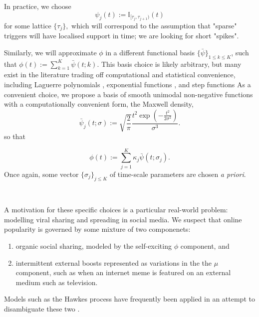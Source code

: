 \documentclass[11pt]{article}
\providecommand{\tightlist}{%
      \setlength{\itemsep}{0pt}\setlength{\parskip}{0pt}}
\begin{document}
In practice, we choose
\[\psi_j(t) := \mathbb{I}_{[\tau_{j},\tau_{j+1})}(t)\] for some lattice
\(\{\tau_j\},\) which will correspond to the assumption that "sparse"
triggers will have localised support in time; we are looking for short
"spikes".

Similarly, we will approximate \(\phi\) in a different functional basis
\(\{\bar{\psi}\}_{1\leq k \leq K}\), such that
\(\phi(t):= \sum_{k=1}^K \bar{\psi}(t;k)\). This basis choice is likely
arbitrary, but many exist in the literature trading off computational
and statistical convenience, including Laguerre polynomials
\cite{ogata_linear_1982}, exponential functions
\cite{schoenberg_consistent_2005,rambaldi_modeling_2015}, and step
functions \cite{eichler_graphical_2016} As a convenient choice, we
propose a basis of smooth unimodal non-negative functions with a
computationally convenient form, the Maxwell density,
\[\bar{\psi}_j(t;\sigma):=\sqrt{\frac{2}{\pi}} \frac{t^2\exp\left(-\frac{t^2}{2\sigma^2}\right)}{\sigma^3}.\]
so that

\[\phi(t):= \sum_{j=1}^K \kappa_j\bar{\psi}(t;\sigma_j).\] Once again,
some vector \(\{\sigma_j\}_{j\leq K}\) of time-scale parameters are
chosen \emph{a priori}.



    \begin{center}
    \end{center}
    { \hspace*{\fill} \\}
    
    A motivation for these specific choices is a particular real-world
problem: modelling viral sharing and spreading in social media. We
suspect that online popularity is governed by some mixture of two
componenets:

\begin{enumerate}
\def\labelenumi{\arabic{enumi}.}
\tightlist
\item
  organic social sharing, modeled by the self-exciting \(\phi\)
  component, and
\item
  intermittent external boosts represented as variations in the the
  \(\mu\) component, such as when an internet meme is featured on an
  external medium such as television.
\end{enumerate}

Models such as the Hawkes process have frequently been applied in an
attempt to disambiguate these two
\cite{crane_robust_2008,mitchell_hawkes_2010,rizoiu_expecting_2017}.
\end{document}
